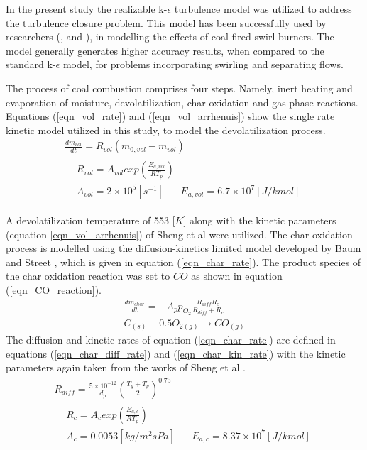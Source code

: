 \documentclass[review]{elsarticle}
\begin{document}
In the present study the realizable k-$\epsilon$ turbulence model was utilized to address the turbulence closure problem. This model has been successfully used by researchers (\cite{Belosevic2019a},\cite{Laubscher2019a} and \cite{Modlinski2019}), in modelling the effects of coal-fired swirl burners. The model generally generates higher accuracy results, when compared to the standard k-$\epsilon$ model, for problems incorporating swirling and separating flows.

The process of coal combustion comprises four steps. Namely, inert heating and evaporation of moisture, devolatilization, char oxidation and gas phase reactions. Equations (\ref{eqn_vol_rate}) and (\ref{eqn_vol_arrhenuis}) show the single rate kinetic model utilized in this study, to model the devolatilization process.
\begin{gather}
\frac{dm_{vol}}{dt} = R_{vol}(m_{0,vol}-m_{vol}) \label{eqn_vol_rate} \\
\begin{split}
&R_{vol} = A_{vol}exp\left(\frac{E_{a,vol}}{RT_p}\right)\\
&A_{vol} = 2\times10^5 [s^{-1}]\,\,\,\,\,\,\,\,\,\,E_{a,vol} = 6.7\times10^7 [J/kmol] \label{eqn_vol_arrhenuis}
\end{split}
\end{gather}

A devolatilization temperature of 553 [$K$] \citep{Ranade2015} along with the kinetic parameters (equation \ref{eqn_vol_arrhenuis}) of Sheng et al \cite{Sheng2004} were utilized. The char oxidation process is modelled using the diffusion-kinetics limited model developed by Baum and Street \cite{Baum1971}, which is given in equation (\ref{eqn_char_rate}). The product species of the char oxidation reaction was set to $CO$ as shown in equation (\ref{eqn_CO_reaction}). 
\begin{gather}
\frac{dm_{char}}{dt} = -A_p p_{O_{2}} \frac{R_{diff}R_c}{R_{diff} + R_c}  \label{eqn_char_rate}\\
C_{(s)}+0.5O_{2(g)}\to CO_{(g)} \label{eqn_CO_reaction}
\end{gather}
The diffusion and kinetic rates of equation (\ref{eqn_char_rate}) are defined in equations (\ref{eqn_char_diff_rate})  and (\ref{eqn_char_kin_rate}) with the kinetic parameters again taken from the works of Sheng et al \citep{Sheng2004}.
\begin{gather}
R_{diff} = \frac{5\times10^{-12}}{d_p} \left(\frac{T_g+T_p}{2}\right)^{0.75} \label{eqn_char_diff_rate}\\
\begin{split}
&R_{c} = A_{c}exp\left(\frac{E_{a,c}}{RT_p}\right)\\
&A_{c} = 0.0053 [kg/m^2sPa]\,\,\,\,\,\,\,\,\,\,E_{a,c} = 8.37\times10^7 [J/kmol]
\end{split}
 \label{eqn_char_kin_rate}
\end{gather}
\end{document}
